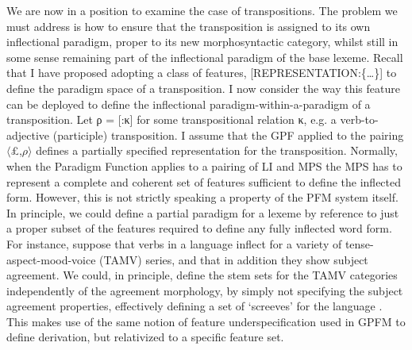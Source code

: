 \documentclass[output=paper,
modfonts
]{LSP/langsci}
\begin{document}
 We are now in a position to examine the case of transpositions. The problem we must address is how to ensure that the transposition is assigned to its own inflectional paradigm, proper to its new morphosyntactic category, whilst still in some sense remaining part of the inflectional paradigm of the base lexeme. %
 Recall that I have proposed adopting a class of features, [REPRESENTATION:\{\ldots\}] to define the paradigm space of a transposition.  I now consider the way this feature can be deployed to define the inflectional paradigm-within-a-paradigm of a transposition. %
Let ρ = [:κ] for some transpositional relation κ, e.g. a verb-to-adjective (participle) transposition. I assume that the GPF applied to the pairing $\langle$\pounds,$\rho$$\rangle$ defines a partially specified representation for the transposition. Normally, when the Paradigm Function applies to a pairing of LI and MPS the MPS has to represent a complete and coherent set of features sufficient to define the inflected form. However, this is not strictly speaking a property of the PFM system itself. In principle, we could define a partial paradigm for a lexeme by reference to just a proper subset of the features required to define any fully inflected word form. For instance, suppose that verbs in a language inflect for a variety of tense-aspect-mood-voice (TAMV) series, and that in addition they show subject agreement. We could, in principle, define the stem sets for the TAMV categories independently of the agreement morphology, by simply not specifying the subject agreement properties, effectively defining a set of ‘screeves’ for the language \parencite[as in the Georgian descriptive tradition, ][141]{AndersonSR92:book}. This makes use of the same notion of feature underspecification used in GPFM to define derivation, but relativized to a specific feature set. 
\end{document}
